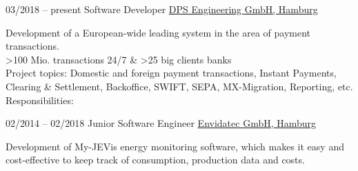 




\begin{minipage}[t]{\textwidth}
\begin{entrylist}
  \entry
  {03/2018 -- present}
  {Software Developer}
  {\href{https://dps.de/}{DPS Engineering GmbH, Hamburg}}
  {Development of a European-wide leading system in the area of payment
transactions.\\
 >100 Mio. transactions 24/7 \& >25 big clients banks\\
 Project topics: Domestic and foreign payment transactions, Instant Payments, Clearing \& Settlement, Backoffice, SWIFT, SEPA, MX-Migration, Reporting, etc.\\
 Responsibilities:

  }
  \entry
  {02/2014 -- 02/2018}
  {Junior Software Engineer}
  {\href{https://envidatec.com/en/}{Envidatec GmbH, Hamburg}}
  {Development of My-JEVis energy monitoring software, which makes it easy and
  cost-effective to keep track of consumption, production data and costs.

  }
\end{entrylist}
\end{minipage}
